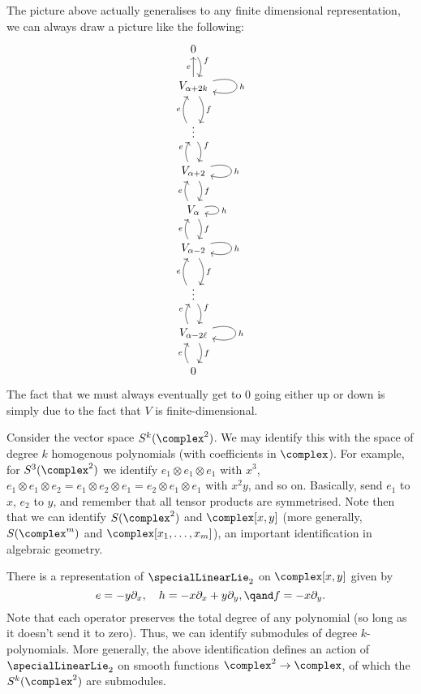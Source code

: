 \documentclass[fleqn]{NotesClass}
\begin{document}
    The picture above actually generalises to any finite dimensional representation, we can always draw a picture like the following:
    \begin{equation}
        \begin{tikzcd}
            0 \arrow[d, bend left, "f"]\\
            V_{\alpha + 2k} \arrow[u, "e"] \arrow[loop right, "h"] \arrow[d, bend left, "f"]\\
            \vdots \arrow[d, bend left, "f"] \arrow[u, bend left, "e"]\\
            V_{\alpha + 2} \arrow[loop right, "h"] \arrow[d, bend left, "f"] \arrow[u, "e", bend left]\\
            V_{\alpha} \arrow[loop right, "h"] \arrow[u, bend left, "e"] \arrow[d, bend left, "f"]\\
            V_{\alpha - 2} \arrow[loop right, "h"] \arrow[u, bend left, "e"] \arrow[d, bend left, "f"]\\
            \vdots \arrow[d, bend left, "f"] \arrow[u, bend left, "e"]\\
            V_{\alpha - 2\ell} \arrow[loop right, "h"] \arrow[d, bend left, "f"] \arrow[u, "e", bend left]\\
            0 \arrow[u, bend left, "e"]
        \end{tikzcd}
    \end{equation}
    The fact that we must always eventually get to \(0\) going either up or down is simply due to the fact that \(V\) is finite-dimensional.
    
    \begin{exm}{}{}
        Consider the vector space \(S^k(\complex^2)\).
        We may identify this with the space of degree \(k\) homogenous polynomials (with coefficients in \(\complex\)).
        For example, for \(S^3(\complex^2)\) we identify \(e_1 \otimes e_1 \otimes e_1\) with \(x^3\), \(e_1 \otimes e_1 \otimes e_2 = e_1 \otimes e_2 \otimes e_1 = e_2 \otimes e_1 \otimes e_1\) with \(x^2y\), and so on.
        Basically, send \(e_1\) to \(x\), \(e_2\) to \(y\), and remember that all tensor products are symmetrised.
        Note then that we can identify \(S(\complex^2)\) and \(\complex[x, y]\) (more generally, \(S(\complex^m)\) and \(\complex[x_1, \dotsc, x_m]\)), an important identification in algebraic geometry.
        
        There is a representation of \(\specialLinearLie_2\) on \(\complex[x, y]\) given by
        \begin{equation}
            e = -y\partial_x, \quad h = -x \partial_x + y \partial_y, \qand f = -x\partial_y.
        \end{equation}
        Note that each operator preserves the total degree of any polynomial (so long as it doesn't send it to zero).
        Thus, we can identify submodules of degree \(k\)-polynomials.
        More generally, the above identification defines an action of \(\specialLinearLie_2\) on smooth functions \(\complex^2 \to \complex\), of which the \(S^k(\complex^2)\) are submodules.
    \end{exm}
    
	\appendixpage
	\begin{appendices}
	    
	\end{appendices}

    \backmatter
    \renewcommand{\glossaryname}{Acronyms}
    \printglossary[acronym]
    \printindex
\end{document}
